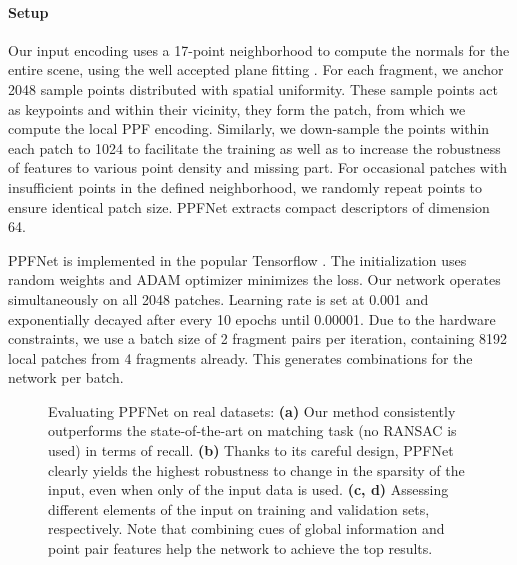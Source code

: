 \documentclass[10pt,twocolumn,letterpaper]{article}
\theoremstyle{break}
\begin{document}
\paragraph{Setup}
Our input encoding uses a 17-point neighborhood to compute the normals for the entire scene, using the well accepted plane fitting \cite{Hoppe1992}. For each fragment, we anchor 2048 sample points distributed with spatial uniformity. These sample points act as keypoints and within their  vicinity, they form the patch, from which we compute the local PPF encoding. Similarly, we down-sample the points within each patch to 1024 to facilitate the training as well as to increase the robustness of features to various point density and missing part. For occasional patches with insufficient points in the defined neighborhood, we randomly repeat points to ensure identical patch size. PPFNet extracts compact descriptors of dimension 64.

PPFNet is implemented in the popular Tensorflow \cite{abadi2016tensorflow}. The initialization uses random weights and ADAM \cite{kingma2014adam} optimizer minimizes the loss. Our network operates simultaneously on all 2048 patches. Learning rate is set at 0.001 and exponentially decayed after every 10 epochs until 0.00001. Due to the hardware constraints, we use a batch size of 2 fragment pairs per iteration, containing 8192 local patches from 4 fragments already. This generates  combinations for the network per batch.
\begin{figure*}[t!]
\centering
{}
\caption{Evaluating PPFNet on real datasets: \textbf{(a)} Our method consistently outperforms the state-of-the-art on matching task (no RANSAC is used) in terms of recall. \textbf{(b)} Thanks to its careful design, PPFNet clearly yields the highest robustness to change in the sparsity of the input, even when only  of the input data is used. \textbf{(c, d)} Assessing different elements of the input on training and validation sets, respectively. Note that combining cues of global information and point pair features help the network to achieve the top results.}
\label{fig:evaluations}
\end{figure*} \vspace{-3mm}
\end{document}
